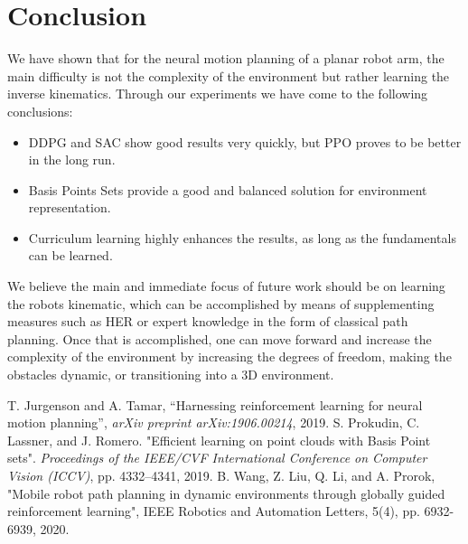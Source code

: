 \documentclass[conference]{IEEEtran}
\begin{document}
\section{Conclusion} 

We have shown that for the neural motion planning of a planar robot arm, the main difficulty is not the complexity of the environment but rather learning the inverse kinematics. Through our experiments we have come to the following conclusions:
 \begin{itemize}
\item DDPG and SAC show good results very quickly, but PPO proves to be better in the long run.
\item Basis Points Sets provide a good and balanced solution for environment representation.
\item Curriculum learning highly enhances the results, as long as the fundamentals can be learned.
\end{itemize}
We believe the main and immediate focus of future work should be on learning the robots kinematic, which can be accomplished by means of supplementing measures such as HER or expert knowledge in the form of classical path planning. Once that is accomplished, one can move forward and increase the complexity of the environment by increasing the degrees of freedom, making the obstacles dynamic, or transitioning into a 3D environment.

\begin{thebibliography}{00}
 T. Jurgenson and A. Tamar, ``Harnessing reinforcement learning for neural
motion planning'',  \textit{arXiv preprint arXiv:1906.00214}, 2019.
 S. Prokudin, C. Lassner, and J. Romero. "Efficient learning on point clouds with Basis Point sets". \textit{Proceedings of the IEEE/CVF International Conference on Computer Vision (ICCV)}, pp. 4332–4341, 2019.
 B. Wang, Z. Liu, Q. Li, and A. Prorok, "Mobile robot path planning in dynamic environments through globally guided reinforcement learning",  IEEE Robotics and Automation Letters, 5(4), pp. 6932-6939, 2020.
\end{thebibliography}
\end{document}
